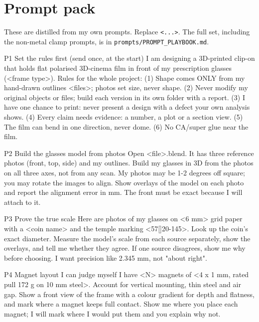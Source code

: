 \documentclass[10pt,a4paper,oneside]{article}
\begin{document}
\section{Prompt pack}
These are distilled from my own prompts. Replace \texttt{<...>}. The full set, including the non-metal clamp prompts, is in \texttt{prompts/PROMPT\_PLAYBOOK.md}.

\begin{template}{P1 \textbullet{} Set the rules first (send once, at the start)}
I am designing a 3D-printed clip-on that holds flat polarised 3D-cinema film in front of my prescription glasses (<frame type>).
Rules for the whole project: (1) Shape comes ONLY from my hand-drawn outlines <files>; photos set size, never shape. (2) Never modify my
original objects or files; build each version in its own folder with a report. (3) I have one chance to print: never present a design with
a defect your own analysis shows. (4) Every claim needs evidence: a number, a plot or a section view. (5) The film can bend in one direction,
never dome. (6) No CA/super glue near the film.
\end{template}

\begin{template}{P2 \textbullet{} Build the glasses model from photos}
Open <file>.blend. It has three reference photos (front, top, side) and my outlines. Build my glasses in 3D from the photos on all three
axes, not from any scan. My photos may be 1-2 degrees off square; you may rotate the images to align. Show overlays of the model on each photo
and report the alignment error in mm. The front must be exact because I will attach to it.
\end{template}

\begin{template}{P3 \textbullet{} Prove the true scale}
Here are photos of my glasses on <6 mm> grid paper with a <coin name> and the temple marking <57[]20-145>. Look up the coin's exact diameter.
Measure the model's scale from each source separately, show the overlays, and tell me whether they agree. If one source disagrees,
show me why before choosing. I want precision like 2.345 mm, not "about right".
\end{template}

\begin{template}{P4 \textbullet{} Magnet layout I can judge myself}
I have <N> magnets of <4 x 1 mm, rated pull 172 g on 10 mm steel>. Account for vertical mounting, thin steel and air gap.
Show a front view of the frame with a colour gradient for depth and flatness, and mark where a magnet keeps full contact.
Show me where you place each magnet; I will mark where I would put them and you explain why not.
\end{template}
\end{document}
